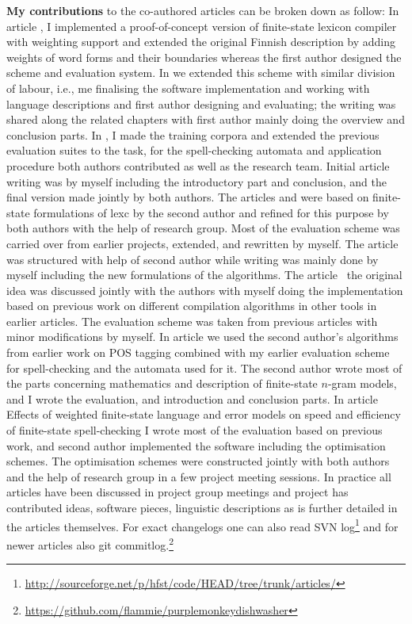 \documentclass[officiallayout]{unihelcompling}
\begin{document}
\textbf{My contributions} to the co-authored articles can be broken down as
follow: In article , I implemented a
proof-of-concept version of finite-state lexicon compiler with weighting
support and extended the original Finnish description by adding weights of
word forms and their boundaries whereas the first author designed the scheme
and evaluation system. In  we extended this
scheme with similar division of labour, i.e., me finalising the software
implementation and working with language descriptions and first author
designing and evaluating; the writing was shared along the related chapters
with first author mainly doing the overview and conclusion parts. In
, I made the training corpora and extended
the previous evaluation suites to the task, for the spell-checking automata and
application procedure both authors contributed as well as the research team.
Initial article writing was by myself including the introductory part and
conclusion, and the final version made jointly by both authors. The articles
 and  were
based on finite-state formulations of lexc by the second author and refined for
this purpose by both authors with the help of research group. Most of the
evaluation scheme was carried over from earlier projects, extended, and
rewritten by myself. The article was structured with help of second author
while writing was mainly done by myself including the new formulations of the
algorithms. The article~ the original idea was
discussed jointly with the authors with myself doing the implementation based
on previous work on different compilation algorithms in other tools in earlier
articles.  The evaluation scheme was taken from previous articles with minor
modifications by myself. In article  we used
the second author's algorithms from earlier work on POS tagging combined with
my earlier evaluation scheme for spell-checking and the automata used for it.
The second author wrote most of the parts concerning mathematics and
description of finite-state \(n\)-gram models, and I wrote the evaluation, and
introduction and conclusion parts. In article 
Effects of weighted finite-state language and error models on speed and
efficiency of finite-state spell-checking I wrote most of the evaluation based
on previous work, and second author implemented the software including the
optimisation schemes. The optimisation schemes were constructed jointly with
both authors and the help of research group in a few project meeting sessions.
In practice all articles have been discussed in project group meetings and
project has contributed ideas, software pieces, linguistic descriptions as is
further detailed in the articles themselves. For exact changelogs one can also
read SVN
log\footnote{\url{http://sourceforge.net/p/hfst/code/HEAD/tree/trunk/articles/}}
and for newer articles also git
commitlog.\footnote{\url{https://github.com/flammie/purplemonkeydishwasher}}
\end{document}
